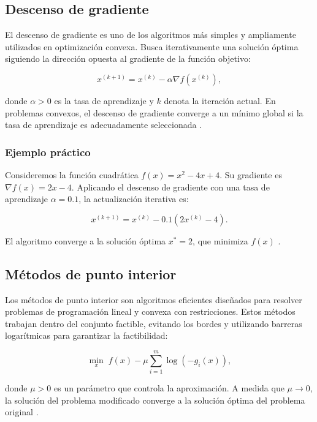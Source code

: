 \subsection{Descenso de gradiente}

El descenso de gradiente es uno de los algoritmos más simples y ampliamente utilizados en optimización convexa. Busca iterativamente una solución óptima siguiendo la dirección opuesta al gradiente de la función objetivo:

\begin{equation}
	x^{(k+1)} = x^{(k)} - \alpha \nabla f(x^{(k)}),
\end{equation}

donde \(\alpha > 0\) es la tasa de aprendizaje y \(k\) denota la iteración actual. En problemas convexos, el descenso de gradiente converge a un mínimo global si la tasa de aprendizaje es adecuadamente seleccionada \cite{nocedal1999optimization}.

\subsubsection{Ejemplo práctico}

Consideremos la función cuadrática \(f(x) = x^2 - 4x + 4\). Su gradiente es \(\nabla f(x) = 2x - 4\). Aplicando el descenso de gradiente con una tasa de aprendizaje \(\alpha = 0.1\), la actualización iterativa es:

\begin{equation}
	x^{(k+1)} = x^{(k)} - 0.1 (2x^{(k)} - 4).
\end{equation}

El algoritmo converge a la solución óptima \(x^* = 2\), que minimiza \(f(x)\) \cite{boyd2004convex}.

\subsection{Métodos de punto interior}

Los métodos de punto interior son algoritmos eficientes diseñados para resolver problemas de programación lineal y convexa con restricciones. Estos métodos trabajan dentro del conjunto factible, evitando los bordes y utilizando barreras logarítmicas para garantizar la factibilidad:

\begin{equation}
	\min_x \; f(x) - \mu \sum_{i=1}^m \log(-g_i(x)),
\end{equation}

donde \(\mu > 0\) es un parámetro que controla la aproximación. A medida que \(\mu \to 0\), la solución del problema modificado converge a la solución óptima del problema original \cite{nocedal1999optimization}.

